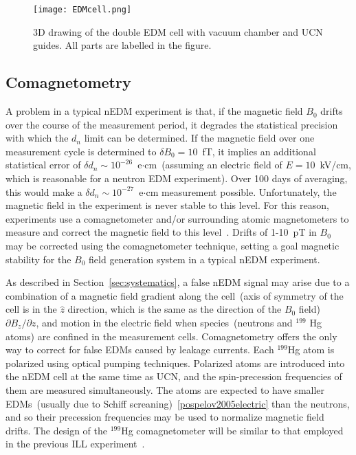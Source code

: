 \begin{figure}[h!]
  \centering
  \texttt{[image: EDMcell.png]}
  \caption[3D drawing of TUCAN's double EDM cell]{3D drawing of the
    double EDM cell with vacuum chamber and UCN guides. All parts are
    labelled in the figure.}
  \label{fig:HVcell}
\end{figure}



\subsection{Comagnetometry~\label{sec:comag}}
A problem in a typical nEDM experiment is that, if the magnetic field
$B_0$ drifts over the course of the measurement period, it degrades
the statistical precision with which the $d_n$ limit can be
determined.  If the magnetic field over one measurement cycle is
determined to $\delta B_0=10$~fT, it implies an additional statistical
error of $\delta d_n\sim 10^{-26}$~e$\cdot$cm~(assuming an electric
field of $E=10$~kV/cm, which is reasonable for a neutron EDM
experiment). Over 100 days of averaging, this would make a
$\delta d_n\sim 10^{-27}$~e$\cdot$cm measurement possible.
Unfortunately, the magnetic field in the experiment is never stable to
this level.  For this reason, experiments use a comagnetometer and/or
surrounding atomic magnetometers to measure and correct the magnetic
field to this
level~\cite{Baker2006,brys2005magnetic,afach2014dynamic}. Drifts of
1-10~pT in $B_0$ may be corrected using the comagnetometer technique,
setting a goal magnetic stability for the $B_0$ field generation
system in a typical nEDM experiment.



As described in Section~\ref{sec:systematics}, a false nEDM signal may
arise due to a combination of a magnetic field gradient along the
cell~(axis of symmetry of the cell is in the $\hat{z}$ direction,
which is the same as the direction of the $B_0$ field)
$\partial {B_z}/\partial z$, and motion in the electric field when
species~(neutrons and $^{199}$ Hg atoms) are confined in the
measurement cells. Comagnetometry offers the only way to correct for
false EDMs caused by leakage currents.  Each $^{199}$Hg atom is
polarized using optical pumping techniques. Polarized atoms are
introduced into the nEDM cell at the same time as UCN, and the
spin-precession frequencies of them are measured simultaneously. The
atoms are expected to have smaller EDMs~(usually due to Schiff
screaning)~\ref{pospelov2005electric} than the neutrons, and so their
precession frequencies may be used to normalize magnetic field drifts.
The design of the $^{199}$Hg comagnetometer will be similar to that
employed in the previous ILL experiment~\cite{Baker2006,Griffith2009}.

